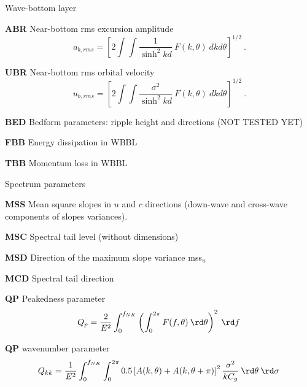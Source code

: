 \begin{list}{)\hfill}
\item{Wave-bottom layer}

\begin{list}{)\hfill}
            { \leftmargin 8mm 
             \rightmargin 0mm \itemsep 0mm \parsep 0mm}

\item \textbf{ABR} Near-bottom rms excursion amplitude
      \begin{equation} a_{b,rms} = \left [ 2 \int \!\!\!\! \int
      \frac{1}{\sinh^2 kd} \: F(k,\theta) \: dk d\theta \right ] ^{1/2}
      \: . \label{eq:ab_rms} \end{equation}
\item \textbf{UBR} Near-bottom rms orbital velocity
      \begin{equation} u_{b,rms} = \left [ 2 \int \!\!\!\! \int
      \frac{\sigma^2}{\sinh^2 kd} \: F(k,\theta) \: dk d\theta \right ] ^{1/2}
      \: . \label{eq:ub_rms} \end{equation}
\item \textbf{BED} Bedform parameters: ripple height and directions (NOT TESTED YET)   
\item \textbf{FBB} Energy dissipation in WBBL 
\item \textbf{TBB} Momentum loss in WBBL 
\end{list}

\item{Spectrum parameters}

\begin{list}{)\hfill}
            { \leftmargin 8mm 
             \rightmargin 0mm \itemsep 0mm \parsep 0mm}

\item \textbf{MSS} Mean square slopes in $u$ and $c$ directions (down-wave and cross-wave components of slopes variances). 
\item \textbf{MSC} Spectral tail level (without dimensions) 
\item \textbf{MSD} Direction of the maximum slope variance mss$_u$
\item \textbf{MCD} Spectral tail direction
\item \textbf{QP}  Peakedness parameter \citep{art:G70}
      \begin{equation} Q_p = \frac{2}{E^2} \int_0^{f_{NK}} \left( \int_0^{2\pi} 
      F(f,\theta) \:\rd \theta \right)^2 \: \rd  f \: \label{eq:qp}
      \end{equation}
\item \textbf{QP}  wavenumber parameter \citep{art:DC23}
      \begin{equation} Q_{kk} = \frac{1}{E^2} \int_0^{f_{NK}} \int_0^{2\pi} 
      0.5 \left[ A(k,\theta)+ A(k,\theta+\pi)\right]^2 \frac{\sigma^2}{k C_g} \:\rd \theta  \: \rd  \sigma \: \label{eq:qp}
      \end{equation}
\end{list}


\end{list}
